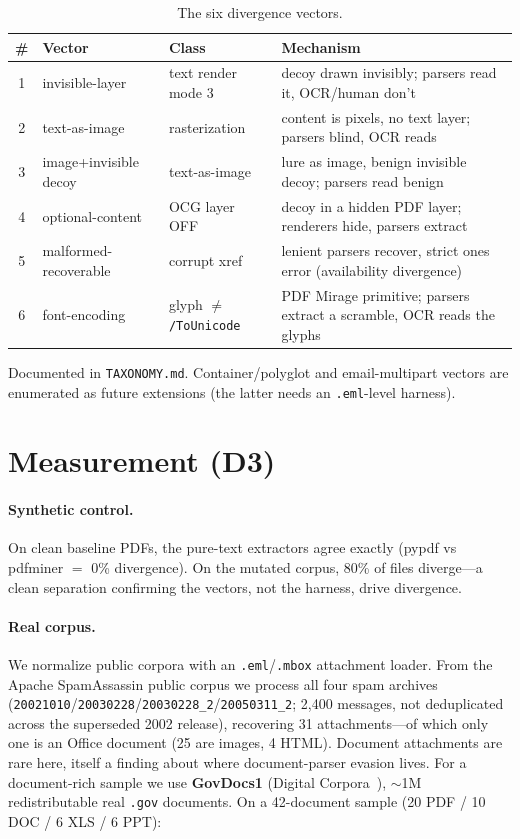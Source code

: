 \documentclass[11pt]{article}
\newcommand{\code}[1]{\texttt{#1}}
\begin{document}
\begin{table}[h]
\centering
\small
\begin{tabularx}{\linewidth}{@{}c l l X@{}}
\toprule
\# & Vector & Class & Mechanism \\
\midrule
1 & invisible-layer & text render mode 3 & decoy drawn invisibly; parsers read it, OCR/human don't \\
2 & text-as-image & rasterization & content is pixels, no text layer; parsers blind, OCR reads \\
3 & image+invisible decoy & text-as-image & lure as image, benign invisible decoy; parsers read benign \\
4 & optional-content & OCG layer OFF & decoy in a hidden PDF layer; renderers hide, parsers extract \\
5 & malformed-recoverable & corrupt xref & lenient parsers recover, strict ones error (availability divergence) \\
6 & font-encoding & glyph $\neq$ \code{/ToUnicode} & PDF Mirage primitive; parsers extract a scramble, OCR reads the glyphs \\
\bottomrule
\end{tabularx}
\caption{The six divergence vectors.}
\end{table}

Documented in \code{TAXONOMY.md}. Container/polyglot and email-multipart vectors
are enumerated as future extensions (the latter needs an \code{.eml}-level
harness).

\section{Measurement (D3)}
\label{sec:measurement}

\paragraph{Synthetic control.} On clean baseline PDFs, the pure-text extractors
agree exactly (pypdf vs pdfminer $=$ 0\% divergence). On the mutated corpus, 80\%
of files diverge---a clean separation confirming the vectors, not the harness,
drive divergence.

\paragraph{Real corpus.} We normalize public corpora with an \code{.eml}/\code{.mbox}
attachment loader. From the Apache SpamAssassin public corpus we process all four
spam archives (\code{20021010}/\code{20030228}/\code{20030228\_2}/\code{20050311\_2};
2{,}400 messages, not deduplicated across the superseded 2002 release), recovering
31 attachments---of which only one is an Office document (25 are images, 4 HTML).
Document attachments are rare here, itself a finding about where document-parser
evasion lives. For a document-rich sample
we use \textbf{GovDocs1} (Digital Corpora~\cite{govdocs1}), ${\sim}$1M
redistributable real \code{.gov} documents. On a 42-document sample (20 PDF / 10
DOC / 6 XLS / 6 PPT):
\end{document}
